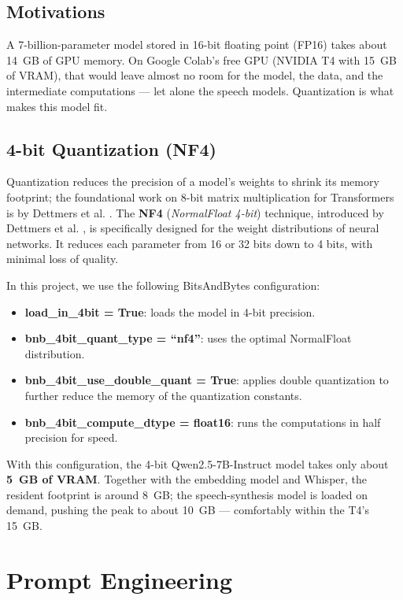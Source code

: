 \documentclass[12pt, a4paper]{report}
\newcommand{\sourced}[1]{#1}        %
\newcommand{\humantext}[1]{#1}      %
\newcommand{\vramResident}{8}\newcommand{\vramPeak}{10}
\begin{document}
\subsection{Motivations}
\humantext{A 7-billion-parameter model stored in 16-bit floating point (FP16) takes about 14~GB of GPU memory. On Google Colab's free GPU (NVIDIA T4 with 15~GB of VRAM), that would leave almost no room for the model, the data, and the intermediate computations --- let alone the speech models. Quantization is what makes this model fit.}

\subsection{4-bit Quantization (NF4)}
\sourced{Quantization reduces the precision of a model's weights to shrink its memory footprint; the foundational work on 8-bit matrix multiplication for Transformers is by Dettmers et al. \cite{dettmers2022int8}. The \textbf{NF4} (\textit{NormalFloat 4-bit}) technique, introduced by Dettmers et al. \cite{dettmers2023qlora}, is specifically designed for the weight distributions of neural networks. It reduces each parameter from 16 or 32 bits down to 4 bits, with minimal loss of quality.}

\humantext{In this project, we use the following BitsAndBytes configuration:}
\begin{itemize}[noitemsep]
    \item \humantext{\textbf{load\_in\_4bit = True}: loads the model in 4-bit precision.}
    \item \humantext{\textbf{bnb\_4bit\_quant\_type = ``nf4''}: uses the optimal NormalFloat distribution.}
    \item \humantext{\textbf{bnb\_4bit\_use\_double\_quant = True}: applies double quantization to further reduce the memory of the quantization constants.}
    \item \humantext{\textbf{bnb\_4bit\_compute\_dtype = float16}: runs the computations in half precision for speed.}
\end{itemize}

\humantext{With this configuration, the 4-bit Qwen2.5-7B-Instruct model takes only about \textbf{5~GB of VRAM}. Together with the embedding model and Whisper, the resident footprint is around \vramResident~GB; the speech-synthesis model is loaded on demand, pushing the peak to about \vramPeak~GB --- comfortably within the T4's 15~GB.}

\section{Prompt Engineering}
\end{document}
